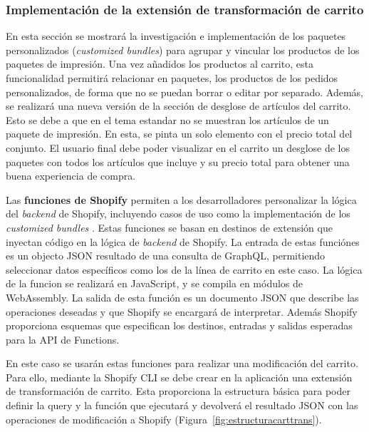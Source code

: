 \documentclass[11pt]{article}
\begin{document}
\clearpage
\subsubsection{Implementación de la extensión de transformación de carrito}
En esta sección se mostrará la investigación e implementación de los paquetes personalizados (\textit{customized bundles}) para agrupar y vincular los
productos de los paquetes de impresión. Una vez añadidos los productos al carrito, esta funcionalidad permitirá relacionar en paquetes, los productos de los pedidos personalizados, de forma que no se puedan borrar
o editar por separado. Además, se realizará una nueva versión de la sección de desglose de artículos del carrito. Esto se debe a que en el tema estandar no se muestran los artículos de un paquete 
de impresión. En esta, se pinta un solo elemento con el precio total del conjunto. El usuario final debe poder visualizar en el carrito un desglose de los paquetes con todos los artículos que incluye y su precio 
total para obtener una buena experiencia de compra.

Las \textbf{funciones de Shopify} \cite{shopify-functions} permiten a los desarrolladores personalizar la lógica del \textit{backend} de Shopify, incluyendo casos de uso como la implementación de los
\textit{customized bundles} \cite{paquete-personalizado}. Estas funciones se basan en destinos de extensión que inyectan código en la lógica de \textit{backend} de Shopify. La entrada de estas funciónes es un objecto JSON resultado de una
consulta de GraphQL, permitiendo seleccionar datos específicos como los de la línea de carrito en este caso. La lógica de la funcion se realizará en JavaScript, y se compila en módulos de WebAssembly.
La salida de esta función es un documento JSON que describe las operaciones deseadas y que Shopify se encargará de interpretar. Además Shopify proporciona esquemas que especifican los 
destinos, entradas y salidas esperadas para la API de Functions.

En este caso se usarán estas funciones para realizar una modificación del carrito. Para ello, mediante la Shopify CLI se debe crear en la aplicación una extensión de transformación de carrito. Esta proporciona 
la estructura básica para poder definir la query y la función que ejecutará y devolverá el resultado JSON con las operaciones de modificación a Shopify (Figura~\ref{fig:estructuracarttrans}). 
\end{document}
